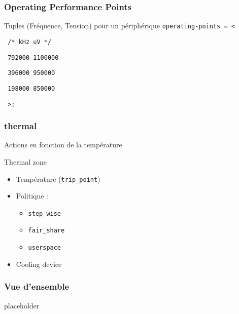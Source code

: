 \begin{frame}
	\frametitle{Operating Performance Points}
	\begin{block}{Tuples (Fréquence, Tension) pour un périphérique}
	\texttt{operating-points = <}

	\texttt{     /* kHz    uV */}

	\texttt{     792000  1100000}

	\texttt{     396000  950000}

	\texttt{     198000  850000}

	\texttt{     >;}
	\end{block}
\end{frame}
\begin{frame}
	\frametitle{thermal}
	Actions en fonction de la température
	\begin{block}{Thermal zone}
		\begin{itemize}
			\item<2-> Température (\texttt{trip\_point})
			\item<3-> Politique :
				\begin{itemize}
					\item<4-> \texttt{step\_wise}
					\item<5-> \texttt{fair\_share}
					\item<6-> \texttt{userspace}
				\end{itemize}
			\item<7-> Cooling device
		\end{itemize}
	\end{block}
\end{frame}

\begin{frame}
	\frametitle{Vue d'ensemble}
	\begin{center}
		placeholder
	\end{center}
\end{frame}
